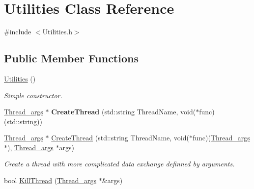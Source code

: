 \hypertarget{classUtilities}{\section{Utilities Class Reference}
\label{classUtilities}
}


{\ttfamily \#include $<$Utilities.\-h$>$}

\subsection*{Public Member Functions}
\begin{DoxyCompactItemize}
\item 
\hypertarget{classUtilities_ab1676c9ce35cf347a73d16f1094e1271}{\hyperlink{classUtilities_ab1676c9ce35cf347a73d16f1094e1271}{Utilities} ()}\label{classUtilities_ab1676c9ce35cf347a73d16f1094e1271}

\begin{DoxyCompactList}\small\item\em Simple constructor. \end{DoxyCompactList}\item 
\hypertarget{classUtilities_ac9c2f86e8279a0341dcf8ce85a92c86b}{\hyperlink{structThread__args}{Thread\-\_\-args} $\ast$ {\bfseries Create\-Thread} (std\-::string Thread\-Name, void($\ast$func)(std\-::string))}\label{classUtilities_ac9c2f86e8279a0341dcf8ce85a92c86b}

\item 
\hypertarget{classUtilities_ae52d1dd16b34518b2ef4de01660cb8b2}{\hyperlink{structThread__args}{Thread\-\_\-args} $\ast$ \hyperlink{classUtilities_ae52d1dd16b34518b2ef4de01660cb8b2}{Create\-Thread} (std\-::string Thread\-Name, void($\ast$func)(\hyperlink{structThread__args}{Thread\-\_\-args} $\ast$), \hyperlink{structThread__args}{Thread\-\_\-args} $\ast$args)}\label{classUtilities_ae52d1dd16b34518b2ef4de01660cb8b2}

\begin{DoxyCompactList}\small\item\em Create a thread with more complicated data exchange definned by arguments. \end{DoxyCompactList}\item 
\hypertarget{classUtilities_a6f1c1d53b9ce59bb26c56a3bebdbb255}{bool \hyperlink{classUtilities_a6f1c1d53b9ce59bb26c56a3bebdbb255}{Kill\-Thread} (\hyperlink{structThread__args}{Thread\-\_\-args} $\ast$\&args)}\label{classUtilities_a6f1c1d53b9ce59bb26c56a3bebdbb255}


\end{DoxyCompactItemize}
